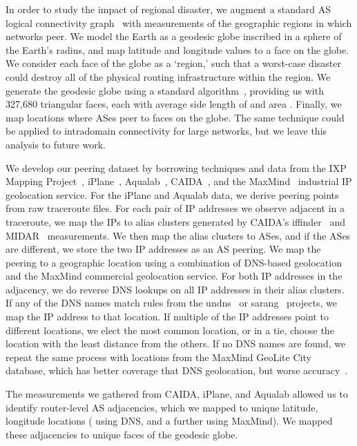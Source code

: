     In order to study the impact of regional disaster, we augment a standard AS logical connectivity graph~\cite{caida-asgraph} with measurements of the geographic regions in which networks peer.
    We model the Earth as a geodesic globe inscribed in a sphere of the Earth's radius, and map latitude and longitude values to a face on the globe.
    We consider each face of the globe as a `region,' such that a worst-case disaster could destroy all of the physical routing infrastructure within the region.
    We generate the geodesic globe using a standard algorithm~\cite{geodesic}, providing us with 327,680 triangular faces, each with average side length of  and area .  
    Finally, we map locations where ASes peer to faces on the globe.
    The same technique could be applied to intradomain connectivity for large networks, but we leave this analysis to future work.    
 
    We develop our peering dataset by borrowing techniques and data from
    the IXP
    Mapping Project~\cite{ixps-mapped}, iPlane~\cite{iplane},
    Aqualab~\cite{sidewalk},
    CAIDA~\cite{caidadata}, and the MaxMind~\cite{maxmind} industrial IP geolocation service.
    For the iPlane and Aqualab data, we derive peering points from raw traceroute files.
    For each pair of IP addresses we observe adjacent in a traceroute, we map the IPs to alias clusters generated by CAIDA's iffinder~\cite{iffinder} and MIDAR~\cite{iffinder, midar} measurements.
    We then map the alias clusters to ASes, and if the ASes are different, we store the two IP addresses as an AS peering.
    We map the peering to a geographic location using a combination of DNS-based geolocation and the MaxMind commercial geolocation service.
    For both IP addresses in the adjacency, we do reverse DNS lookups on all IP addresses in their alias clusters. 
    If any of the DNS names match rules from the undns~\cite{undns} or sarang~\cite{sarang} projects, we map the IP address to that location. 
    If multiple of the IP addresses point to different locations, we elect the most common location, or in a tie, choose the location with the least distance from the others.
    If no DNS names are found, we repeat the same process with locations from the MaxMind GeoLite City database, which has better coverage that DNS geolocation, but worse accuracy~\cite{uhlig_ccr_paper}. 
    
    The measurements we gathered from CAIDA, iPlane, and Aqualab allowed us to identify  router-level AS adjacencies, which we mapped to  unique latitude, longitude locations ( using DNS, and a further  using MaxMind). 
    We mapped these adjacencies to  unique faces of the geodesic globe.   
 
